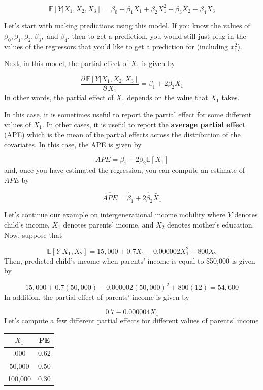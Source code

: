 \documentclass[
  letterpaper,
  DIV=11,
  numbers=noendperiod]{scrreprt}
\begin{document}
\[ 
  \mathbb{E}[Y|X_1,X_2,X_3] = \beta_0 + \beta_1 X_1 + \beta_2 X_1^2 + \beta_3 X_2 + \beta_4 X_3
\]

Let's start with making predictions using this model. If you know the
values of \(\beta_0,\beta_1,\beta_2,\beta_3,\) and \(\beta_4\), then to
get a prediction, you would still just plug in the values of the
regressors that you'd like to get a prediction for (including
\(x_1^2\)).

Next, in this model, the partial effect of \(X_1\) is given by

\[
  \frac{\partial \, \mathbb{E}[Y|X_1,X_2,X_3]}{\partial \, X_1} = \beta_1 + 2\beta_2 X_1
\] In other words, the partial effect of \(X_1\) depends on the value
that \(X_1\) takes.

In this case, it is sometimes useful to report the partial effect for
some different values of \(X_1\). In other cases, it is useful to report
the \textbf{average partial effect} (APE) which is the mean of the
partial effects across the distribution of the covariates. In this case,
the APE is given by

\[
  APE = \beta_1 + 2 \beta_2 \mathbb{E}[X_1]
\] and, once you have estimated the regression, you can compute an
estimate of \(APE\) by

\[
  \widehat{APE} = \hat{\beta}_1 + 2 \hat{\beta}_2 \bar{X}_1
\]

Let's continue our example on intergenerational income mobility where
\(Y\) denotes child's income, \(X_1\) denotes parents' income, and
\(X_2\) denotes mother's education. Now, suppose that

\[
  \mathbb{E}[Y|X_1,X_2] = 15,000 + 0.7 X_1 - 0.000002 X_1^2 + 800 X_2
\] Then, predicted child's income when parents' income is equal to
\$50,000 is given by

\[
  15,000 + 0.7 (50,000) - 0.000002 (50,000)^2 + 800 (12) = 54,600
\] In addition, the partial effect of parents' income is given by

\[
  0.7 - 0.000004 X_1 
\] Let's compute a few different partial effects for different values of
parents' income

\begin{longtable}[]{@{}cc@{}}
\toprule\noalign{}
\(X_1\) & PE \\
\midrule\noalign{}
\endhead
\bottomrule\noalign{}
\endlastfoot
20,000 & 0.62 \\
50,000 & 0.50 \\
100,000 & 0.30 \\
\end{longtable}
\end{document}

